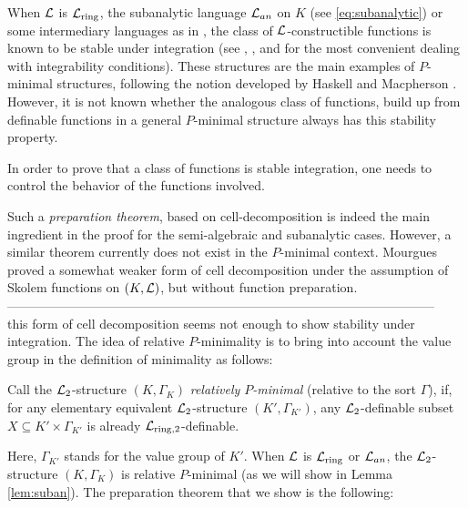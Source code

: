 When ${\mathcal L}$ is ${\mathcal L}_{\rm ring}$, the subanalytic language $\mathcal{L}_{an}$ on $K$ (see \ref{eq:subanalytic}) or some intermediary languages as in \cite{CLip}, the class of $\mathcal{L}$-constructible functions is known to be stable under integration (see \cite{denef-2000}, \cite{Clu-2003}, and \cite{Clu-Gor-Hal-14} for the most convenient dealing with integrability conditions). These structures are the main examples of $P$-minimal structures, following the notion developed by Haskell and Macpherson \cite{has-mac-97}. However, it is not known whether the analogous class of functions, build up from definable functions in a general $P$-minimal structure always has this stability property. 

In order to prove that a class of functions is stable integration, one needs to control the behavior of the functions involved.%

Such a \emph{preparation theorem}, based on cell-decomposition is indeed the main ingredient in the proof for the semi-algebraic and subanalytic cases.
However, a similar theorem currently does not exist in the $P$-minimal context. Mourgues \cite{mou-09} proved a somewhat weaker form of cell decomposition under the assumption of Skolem functions on $(K,{\mathcal L})$, but without function preparation.
\\
-----------------------------------------------------------------------------------------------------
\\

this form of cell decomposition seems not enough to show stability under integration. The idea of relative $P$-minimality is to bring into account the value group in the definition of minimality as follows:

\begin{defn}
Call the $\mathcal{L}_2$-structure $(K,\Gamma_K)$ \emph{relatively $P$-minimal} (relative to the sort $\Gamma$), if, for any elementary equivalent $\mathcal{L}_2$-structure $(K',\Gamma_{K'})$, any $\mathcal{L}_2$-definable subset $X\subseteq K'\times \Gamma_{K'}$ is already ${\mathcal L}_{\rm ring, 2}$-definable.
\end{defn}
Here, $\Gamma_{K'}$ stands for the value group of $K'$. When ${\mathcal L}$ is ${\mathcal L}_{\rm ring}$ or $\mathcal{L}_{an}$, the $\mathcal{L}_2$-structure $(K,\Gamma_K)$ is relative $P$-minimal (as we will show in Lemma \ref{lem:suban}). The preparation theorem that we show is the following:  

